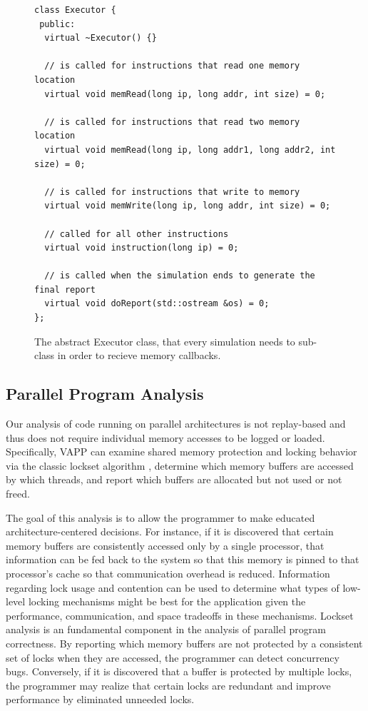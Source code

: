 \begin{figure}
  \lstset{
    language=C++,
    basicstyle=\small,
  }
  \begin{lstlisting}
class Executor {
 public:
  virtual ~Executor() {}

  // is called for instructions that read one memory location
  virtual void memRead(long ip, long addr, int size) = 0;

  // is called for instructions that read two memory location
  virtual void memRead(long ip, long addr1, long addr2, int size) = 0;

  // is called for instructions that write to memory
  virtual void memWrite(long ip, long addr, int size) = 0;

  // called for all other instructions
  virtual void instruction(long ip) = 0;

  // is called when the simulation ends to generate the final report
  virtual void doReport(std::ostream &os) = 0;
};
  \end{lstlisting}
  \caption{The abstract Executor class, that every simulation needs to
    sub-class in order to recieve memory callbacks.}
  \label{fig:executor}
\end{figure}

\subsection{Parallel Program Analysis}
Our analysis of code running on parallel architectures is
not replay-based and thus does not require individual memory
accesses to be logged or loaded.  Specifically, VAPP can
examine shared memory protection and locking behavior via
the classic lockset algorithm \cite{savage1997eraser},
determine which memory buffers are accessed by which threads,
and report which buffers are allocated but not used or not freed.

The goal of this analysis is to allow the programmer to make
educated architecture-centered decisions.  For instance, if
it is discovered that certain memory buffers are consistently
accessed only by a single processor, that information can be
fed back to the system so that this memory is pinned to that
processor's cache so that communication overhead is reduced.
Information regarding lock usage and contention can be
used to determine what types of low-level locking mechanisms
might be best for the application given the performance, 
communication, and space tradeoffs in these mechanisms.
Lockset analysis is an fundamental component in the analysis
of parallel program correctness.  By reporting which
memory buffers are not protected by a consistent set of locks
when they are accessed, the programmer can detect concurrency
bugs.  Conversely, if it is discovered that a buffer is
protected by multiple locks, the programmer may realize that
certain locks are redundant and improve performance by eliminated
unneeded locks.

